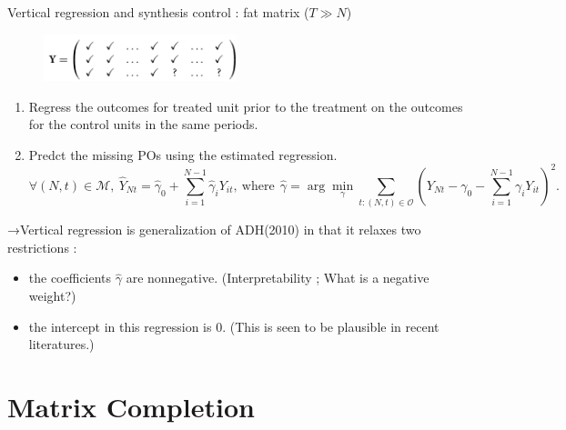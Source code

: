 \documentclass[xcolor=svgnames,aspectratio=169]{beamer}
\begin{document}
\begin{frame}{Vertical regression and synthesis control : fat matrix ($T\gg N$)}
    \begin{figure}
            \includegraphics[width=0.5\textwidth, height=0.5\textheight, keepaspectratio]{Vertical.png}
    \end{figure}
    \begin{enumerate}
        \item Regress the outcomes for treated unit prior to the treatment on the outcomes for the control units in the same periods.
        \item Predct the missing POs using the estimated regression.
        \[
        \forall (N,t)\in\mathcal{M} , \ \hat{Y}_{Nt}=\hat{\gamma}_0+\sum_{i=1}^{N-1}\hat{\gamma}_iY_{it}, \ \text{where} \ \ \hat{\gamma}=\arg\min_{\gamma} \sum_{t:(N,t) \in \mathcal{O} }(Y_{Nt}-\gamma_0-\sum_{i=1}^{N-1}\gamma_iY_{it})^2.
        \]
    \end{enumerate}
    →Vertical regression is generalization of ADH(2010) in that it relaxes two restrictions :
    \begin{itemize}
        \item the coefficients $\hat{\gamma}$ are nonnegative. (Interpretability ; What is a negative weight?)
        \item the intercept in this regression is $0$. (This is seen to be plausible in recent literatures.)
    \end{itemize}
\end{frame}

\section{Matrix Completion}
\end{document}
